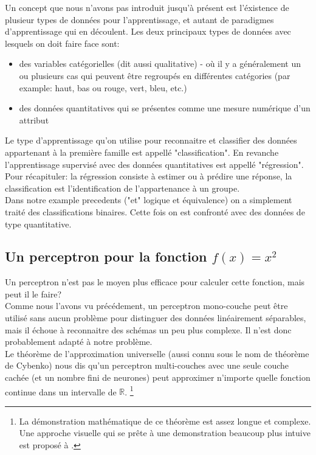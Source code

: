 \documentclass[twoside,openright,a4paper,11pt,french]{article}
\begin{document}
Un concept que nous n'avons pas introduit jusqu'à présent est l'éxistence de plusieur
types de données pour l'apprentissage, et autant de paradigmes d'apprentissage qui en
découlent. Les deux principaux types de données avec lesquels on doit faire
face sont:

\begin{itemize}
\item des variables catégorielles (dit aussi qualitative) - où il y a généralement
      un ou plusieurs cas qui peuvent être regroupés en différentes catégories 
     (par example: haut, bas ou rouge, vert, bleu, etc.)
\item des données quantitatives qui se présentes comme une mesure numérique d'un attribut
\end{itemize}

Le type d'apprentissage qu'on utilise pour reconnaitre et classifier des
données appartenant à la première famille est appellé "classification". 
En revanche l'apprentissage supervisé avec des données quantitatives est appellé
"régression".\cite{kindsNN}\\

Pour récapituler: la régression consiste à estimer ou à prédire une réponse,
la classification est l'identification de l'appartenance à un groupe.\\

Dans notre example precedents ("et" logique et équivalence) on a simplement
traité des classifications binaires. Cette fois on est confronté avec des données
de type quantitative.


\subsection{Un perceptron pour la fonction $f(x) = x^2$}
Un perceptron n'est pas le moyen plus efficace pour calculer cette 
fonction, mais peut il le faire?\\

Comme nous l'avons vu précédement, un perceptron mono-couche peut être utilisé sans aucun
problème pour distinguer des données linéairement séparables, mais il échoue 
à reconnaitre des schémas un peu plus complexe. Il n'est donc 
probablement adapté à notre problème.\\

Le théorème de l'approximation universelle (aussi connu sous le nom de théorème de Cybenko) 
nous dis qu'un perceptron multi-couches avec une seule couche cachée (et un nombre
fini de neurones) peut approximer n'importe quelle fonction continue dans un 
intervalle de $\mathbb{R}$.
\footnote{
La démonstration mathématique de ce théorème est assez longue et complexe. Une approche visuelle
qui se prête à une demonstration beaucoup plus intuive est proposé à \cite{visuniprof}.
}
\cite{cybthm}
\end{document}
